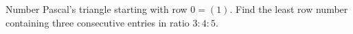 Number Pascal's triangle starting with row $0=(1)$. Find the least row number containing three consecutive entries in ratio $3:4:5$.
